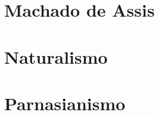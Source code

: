\documentclass[12pt,fleqn]{book}
\begin{document}


\part{Machado de Assis}







\part{Naturalismo}




\part{Parnasianismo}



\end{document}
